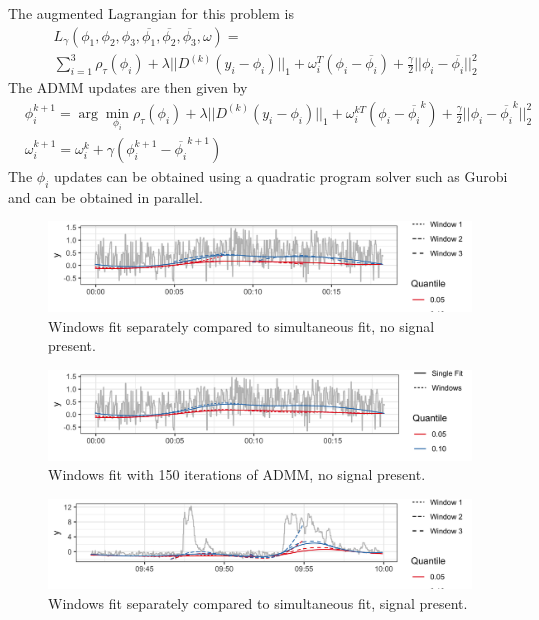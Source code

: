 \documentclass[12pt]{article}
\numberwithin{equation}{section}
\theoremstyle{plain}
\begin{document}
The augmented Lagrangian for this problem is 
\begin{align}
&L_\gamma(\phi_1,\phi_2, \phi_3, \overline{\phi_1}, \overline{\phi_2}, \overline{\phi_3}, \omega) = \\
&\sum_{i=1}^3 \rho_\tau(\phi_i) + \lambda||D^{(k)}(y_i-\phi_i)||_1 + \omega_i^T(\phi_i - \overline{\phi_i}) + \frac{\gamma}{2}||\phi_i - \overline{\phi_i}||_2^2
\end{align}
The ADMM updates are then given by
\begin{align}
&\phi_i^{k+1} = \arg\min_{\phi_i}\rho_\tau(\phi_i) + \lambda||D^{(k)}(y_i-\phi_i)||_1 + \omega_i^{kT}(\phi_i - \overline{\phi_i}^k) + \frac{\gamma}{2}||\phi_i - \overline{\phi_i}^k||_2^2\\
&\omega_i^{k+1} = \omega_i^{k} + \gamma(\phi_i^{k+1} - \overline{\phi_i}^{k+1})
\end{align}
The $\phi_i$ updates can be obtained using a quadratic program solver such as Gurobi and can be obtained in parallel. 

\pagebreak 

\begin{figure}[!h] 
	\caption{Windows fit separately compared to simultaneous fit, no signal present.}
	\includegraphics[width = \linewidth]{Figures/overlapping_windows.png}
\end{figure}

\begin{figure}[!h] 
	\caption{Windows fit with 150 iterations of ADMM, no signal present.}
	\includegraphics[width = \linewidth]{Figures/admm_windows.png}
\end{figure}

\begin{figure}[!h] 
	\caption{Windows fit separately compared to simultaneous fit, signal present.}
	\includegraphics[width = \linewidth]{Figures/overlapping_windows2.png}
\end{figure}
\end{document}
